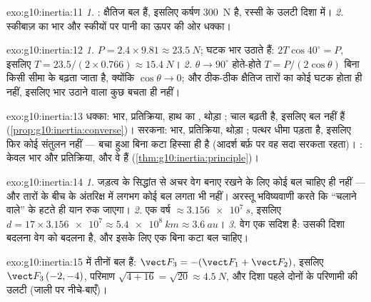 \begin{solution}{exo:g10:inertia:11}
\emph{1.} : क्षैतिज बल
 हैं, इसलिए कर्षण \qty{300}{N} है, रस्सी के उलटी दिशा में।
\emph{2.} स्कीबाज़ का भार और स्कीयों पर पानी का ऊपर की ओर धक्का।
\end{solution}

\begin{solution}{exo:g10:inertia:12}
\emph{1.} $P = 2.4 \times 9.81 \approx \qty{23.5}{N}$;  घटक भार उठाते हैं: $2T\cos 40^\circ = P$, इसलिए
$T = 23.5/(2 \times 0.766) \approx \qty{15.4}{N}$। \emph{2.} $\theta \to 90^\circ$ होते-होते $T = P/(2\cos\theta)$ बिना किसी सीमा के बढ़ता जाता
है, क्योंकि $\cos\theta \to 0$; और ठीक-ठीक क्षैतिज तारों का कोई  घटक होता
ही नहीं, इसलिए भार उठाने वाला कुछ बचता ही नहीं।
\end{solution}

\begin{solution}{exo:g10:inertia:13}
धक्का: भार, प्रतिक्रिया, हाथ का , थोड़ा
; चाल बढ़ती है, इसलिए बल  नहीं हैं
(\cref{prop:g10:inertia:converse})। सरकना: भार, प्रतिक्रिया, थोड़ा ; पत्थर
धीमा पड़ता है, इसलिए फिर कोई संतुलन नहीं --- बचा हुआ बिना कटा हिस्सा
 ही है (आदर्श बर्फ़ पर वह सदा सरकता रहता)। : केवल
भार और प्रतिक्रिया, और वे  हैं (\cref{thm:g10:inertia:principle})।
\end{solution}

\begin{solution}{exo:g10:inertia:14}
\emph{1.} जड़त्व के सिद्धांत से अचर वेग बनाए रखने के लिए कोई बल
चाहिए ही नहीं --- और तारों के बीच के अंतरिक्ष में लगभग कोई बल लगता भी
नहीं। अरस्तू भविष्यवाणी करते कि ``चलाने वाले'' के हटते ही यान रुक जाएगा।
\emph{2.} एक वर्ष $\approx \qty{3.156e7}{s}$, इसलिए $d = 17 \times \num{3.156e7} \approx \qty{5.4e8}{km} \approx
\qty{3.6}{au}$। \emph{3.} वेग एक सदिश है: उसकी
दिशा बदलना वेग को बदलना है, और इसके लिए एक बिना कटा बल चाहिए।
\end{solution}

\begin{solution}{exo:g10:inertia:15}
 में तीनों बल  हैं: $\vect F_3 = -(\vect F_1 + \vect F_2)$, इसलिए
$\vect F_3\,(-2, -4)$, परिमाण $\sqrt{4 + 16} = \sqrt{20} \approx \qty{4.5}{N}$, और दिशा पहले दोनों के परिणामी की उलटी (जाली पर
नीचे-बाएँ)।
\end{solution}

